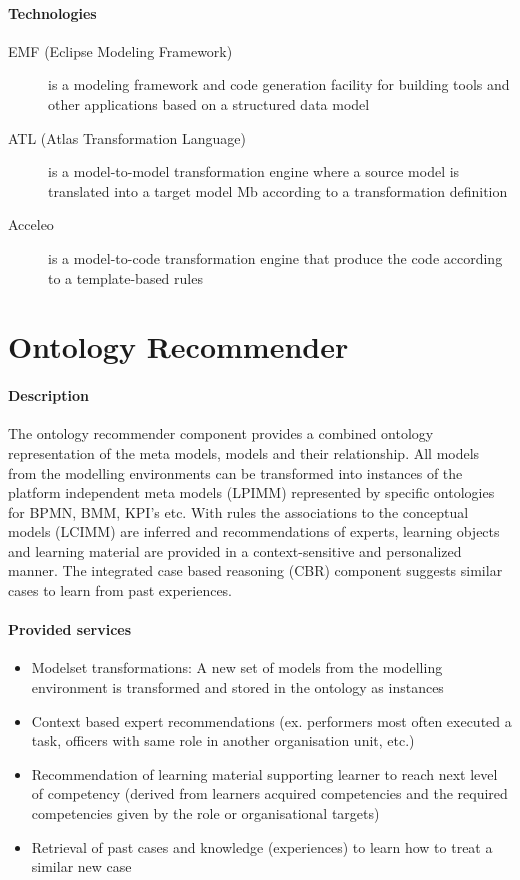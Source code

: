 \documentclass{learnpad}
\begin{document}
\paragraph{Technologies}
\begin{description}
	\item[EMF (Eclipse Modeling Framework)] is a modeling framework and code generation facility for building tools and other applications based on a structured data model
	\item[ATL (Atlas Transformation Language)] is a model-to-model transformation engine where a source model is translated into a target model Mb according to a transformation definition
	\item[Acceleo] is a model-to-code transformation engine that produce the code according to a template-based rules
\end{description}

\section{Ontology Recommender}\label{sec:ontology-recommender}
\paragraph{Description}
The ontology recommender component provides a combined ontology representation
of the \learnpad meta models, models and their relationship. All models from the
modelling environments can be transformed into instances of the platform
independent meta models (LPIMM) represented by specific ontologies for BPMN,
BMM, KPI's etc. With rules the associations to the conceptual models (LCIMM) are
inferred and recommendations of experts, learning objects and learning material
are provided in a context-sensitive and personalized manner. The integrated case
based reasoning (CBR) component suggests similar cases to learn from past
experiences.

\paragraph{Provided services}
\begin{itemize}
	\item Modelset transformations: A new set of models from the modelling
		environment is transformed and stored in the ontology as instances
	\item Context based expert recommendations (ex. performers most often
		executed a task, officers with same role in another organisation unit,
		etc.)
	\item Recommendation of learning material supporting learner to reach next
		level of competency (derived from learners acquired competencies and the
		required competencies given by the role or organisational targets)
	\item Retrieval of past cases and  knowledge (experiences) to learn how to
		treat a similar new case
\end{itemize}
\end{document}
